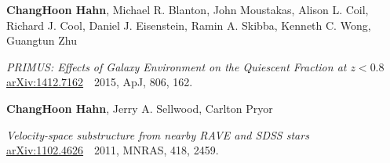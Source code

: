 \documentclass[10pt]{article} %
\begin{document}
{\bf ChangHoon Hahn}, Michael R. Blanton, John Moustakas, Alison L. Coil, Richard J. Cool, Daniel J. Eisenstein, Ramin A. Skibba, Kenneth C. Wong, Guangtun Zhu\\
\begin{addmargin}[1em]{0em}
{\it PRIMUS: Effects of Galaxy Environment on the Quiescent Fraction at $z < 0.8$}\\
\href{http://arxiv.org/abs/1412.7162}{arXiv:1412.7162}~~2015, ApJ, 806, 162.\\[5pt]
\end{addmargin}

{\bf ChangHoon Hahn}, Jerry A. Sellwood, Carlton Pryor \\
\begin{addmargin}[1em]{0em}
{\it Velocity-space substructure from nearby RAVE and SDSS stars}\\
\href{http://arxiv.org/abs/1102.4626}{arXiv:1102.4626}~~2011, MNRAS, 418, 2459. 
\end{addmargin}
\vspace{-0.5cm}




\end{document}
